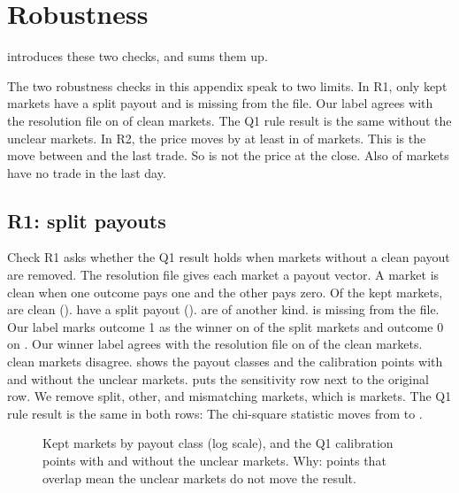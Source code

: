 \section{Robustness}\label{sec:res-robust}
 introduces these two checks, and  sums them up.

The two robustness checks in this appendix speak to two limits.
In R1, only \RobROneSplitN{} kept markets have a split payout and \RobROneMissingN{} is missing from the file.
Our label agrees with the resolution file on \RobROneAgreement{} of clean markets.
The Q1 rule result is the same without the unclear markets.
In R2, the price moves by at least \DeltaA{} in \RobRTwoShareDeltaAtLeastTen{} of markets.
This is the move between \pOne{} and the last trade.
So \pOne{} is not the price at the close.
Also \RobRTwoShareNoTrade{} of markets have no trade in the last day.

\subsection{R1: split payouts}\label{sec:app-r1}
Check R1 asks whether the Q1 result holds when markets without a clean payout are removed.
The resolution file gives each market a payout vector.
A market is clean when one outcome pays one and the other pays zero.
Of the kept markets, \RobROneCleanN{} are clean (\RobROneCleanShare).
\RobROneSplitN{} have a split payout (\RobROneSplitShare).
\RobROneOtherN{} are of another kind.
\RobROneMissingN{} is missing from the file.
Our label marks outcome 1 as the winner on \RobROneSplitYesOne{} of the split markets and outcome 0 on \RobROneSplitYesZero.
Our winner label agrees with the resolution file on \RobROneAgreement{} of the \RobROneNClean{} clean markets.
\RobROneNMismatch{} clean markets disagree.
 shows the payout classes and the calibration points with and without the unclear markets.
 puts the sensitivity row next to the original row.
We remove split, other, and mismatching markets, which is \RobROneNExcluded{} markets.
The Q1 rule result is the same in both rows: \RobROneRuleOriginal{}
The chi-square statistic moves from \QOneChiSq{} to \RobROneSensChiSq.

\begin{figure}[H]
\centering
{}
\caption{Kept markets by payout class (log scale), and the Q1 calibration points with and without the unclear markets. Why: points that overlap mean the unclear markets do not move the result.}%
\label{fig:r1}
\end{figure}

